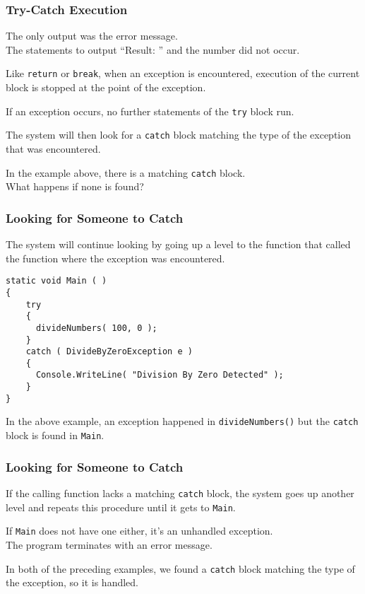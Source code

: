 \begin{frame}
\frametitle{Try-Catch Execution}

The only output was the error message.\\
\quad The statements to output ``Result: '' and the number did not occur.

Like \texttt{return} or \texttt{break}, when an exception is encountered, execution of the current block is stopped at the point of the exception.

If an exception occurs, no further statements of the \texttt{try} block run.

The system will then look for a \texttt{catch} block matching the type of the exception that was encountered.

In the example above, there is a matching \texttt{catch} block.\\
\quad What happens if none is found?

\end{frame}

\begin{frame}[fragile]
\frametitle{Looking for Someone to Catch}

The system will continue looking by going up a level to the function that called the function where the exception was encountered.

\begin{verbatim}
static void Main ( )
{
    try
    {
      divideNumbers( 100, 0 );
    }
    catch ( DivideByZeroException e )
    {
      Console.WriteLine( "Division By Zero Detected" );
    }
}
\end{verbatim}

In the above example, an exception happened in \texttt{divideNumbers()} but the \texttt{catch} block is found in \texttt{Main}.

\end{frame}

\begin{frame}
\frametitle{Looking for Someone to Catch}

If the calling function lacks a matching \texttt{catch} block, the system goes up another level and repeats this procedure until it gets to \texttt{Main}.

If \texttt{Main} does not have one either, it's an unhandled exception.\\
\quad The program terminates with an error message.

In both of the preceding examples, we found a \texttt{catch} block matching the type of the exception, so it is handled.

\end{frame}

